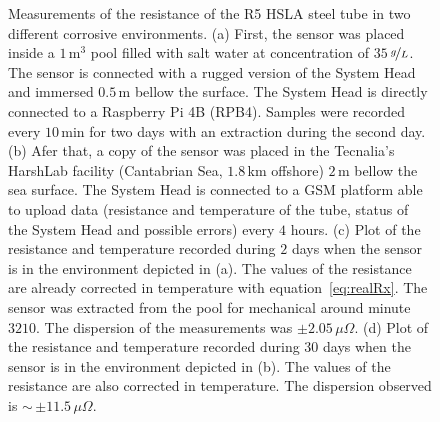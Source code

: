 \documentclass[journal,twoside,web]{ieeecolor}
\begin{document}
\begin{figure}
\caption{Measurements of the resistance of the R5 HSLA steel tube in two different corrosive environments. (a) First, the sensor was placed inside a $1$\,m$^{3}$ pool filled with salt water at concentration of $35$\,$\nicefrac{g}{L}$. The sensor is connected with a rugged version of the System Head and immersed $0.5$\,m bellow the surface. The System Head is directly connected to a Raspberry Pi 4B (RPB4). Samples were recorded every $10$\,min for two days with an extraction during the second day. (b) Afer that, a copy of the sensor was placed in the Tecnalia's HarshLab facility (Cantabrian Sea, $1.8$\,km offshore) $2$\,m bellow the sea surface. The System Head is connected to a GSM platform able to upload data (resistance and temperature of the tube, status of the System Head and possible errors) every $4$ hours. (c) Plot of the resistance and temperature recorded during $2$ days when the sensor is in the environment depicted in (a). The values of the resistance are already corrected in temperature with equation~\ref{eq:realRx}. The sensor was extracted from the pool for mechanical around minute $3210$. The dispersion of the measurements was $\pm2.05$\,$\mu\Omega$. (d) Plot of the resistance and temperature recorded during $30$ days when the sensor is in the environment depicted in (b). The values of the resistance are also corrected in temperature. The dispersion observed is $\sim$\,$\pm11.5$\,$\mu\Omega$.}
\label{fig:poolMeas}
\end{figure}
\end{document}
